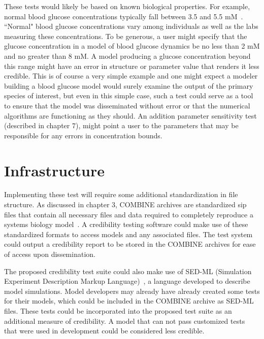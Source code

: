 \documentclass[12pt]{report}
\begin{document}
These tests would likely be based on known biological properties. For example, normal blood glucose concentrations typically fall between 3.5 and 5.5 mM~\cite{Guemes569}. ``Normal" blood glucose concentrations vary among individuals as well as the labs measuring these concentrations. To be generous, a user might specify that the glucose concentration in a model of blood glucose dynamics be no less than 2 mM and no greater than 8 mM. A model producing a glucose concentration beyond this range might have an error in structure or parameter value that renders it less  credible. This is of course a very simple example and one might expect a modeler building a blood glucose model would surely examine the output of the primary species of interest, but even in this simple case, such a test could serve as a tool to ensure that the model was disseminated without error or that the numerical algorithms are functioning as they should. An addition parameter sensitivity test (described in chapter 7), might point a user to the parameters that may be responsible for any errors in concentration bounds.





\section{Infrastructure}
Implementing these test will require some additional standardization in file structure. As discussed in chapter 3, COMBINE archives are standardized sip files that contain all necessary files and data required to completely reproduce a systems biology model~\cite{schreiber_specifications_2020}. A credibility testing software could make use of these standardized formats to access models and any associated files. The test system could output a credibility report to be stored in the COMBINE archives for ease of access upon dissemination.

The proposed credibility test suite could also make use of SED-ML (Simulation Experiment Description Markup Language)~\cite{bergmann_simulation_2018,Smith2021simulation, bergmann_combine_2014}, a language developed to describe model simulations. Model developers may already have already created some tests for their models, which could be included in the COMBINE archive as SED-ML files. These tests could  be incorporated into the proposed test suite as an additional measure of credibility. A model that can not pass customized tests that were used in development could be considered less credible.
\end{document}
